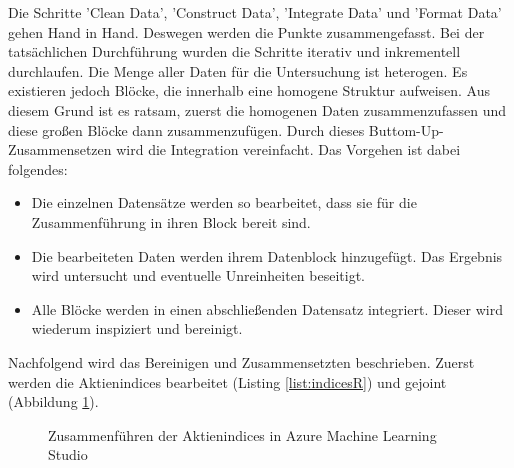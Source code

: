 Die Schritte 'Clean Data', 'Construct Data', 'Integrate Data' und 'Format Data' gehen Hand in Hand. Deswegen werden die Punkte zusammengefasst. Bei der tatsächlichen Durchführung wurden die Schritte iterativ und inkrementell durchlaufen. \newline
Die Menge aller Daten für die Untersuchung ist heterogen. Es existieren jedoch Blöcke, die innerhalb eine homogene Struktur aufweisen. Aus diesem Grund ist es ratsam, zuerst die homogenen Daten zusammenzufassen und diese großen Blöcke dann zusammenzufügen. Durch dieses Buttom-Up-Zusammensetzen wird die Integration vereinfacht.
Das Vorgehen ist dabei folgendes:
\begin{itemize}
\item Die einzelnen Datensätze werden so bearbeitet, dass sie für die Zusammenführung in ihren Block bereit sind.
\item Die bearbeiteten Daten werden ihrem Datenblock hinzugefügt. Das Ergebnis wird untersucht und eventuelle Unreinheiten beseitigt.
\item Alle Blöcke werden in einen abschließenden Datensatz integriert. Dieser wird wiederum inspiziert und bereinigt.
\end{itemize}
Nachfolgend wird das Bereinigen und Zusammensetzten beschrieben. Zuerst werden die Aktienindices bearbeitet (Listing \ref{list:indicesR}) und gejoint (Abbildung \ref{fig:indicesAzure_1}). 

\begin{figure}[H]
\caption{Zusammenführen der Aktienindices in Azure Machine Learning Studio}
\label{fig:indicesAzure_1}
\centering
\end{figure}

